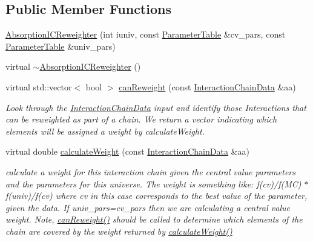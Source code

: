 \subsection*{Public Member Functions}
\begin{DoxyCompactItemize}
\item 
\hyperlink{class_neutrino_flux_reweight_1_1_absorption_i_c_reweighter_a16ce26791334162b0a512667f93044fc}{Absorption\-I\-C\-Reweighter} (int iuniv, const \hyperlink{class_neutrino_flux_reweight_1_1_parameter_table}{Parameter\-Table} \&cv\-\_\-pars, const \hyperlink{class_neutrino_flux_reweight_1_1_parameter_table}{Parameter\-Table} \&univ\-\_\-pars)
\item 
virtual \hyperlink{class_neutrino_flux_reweight_1_1_absorption_i_c_reweighter_a2851345b01ad24a57576a7d6e1c32da0}{$\sim$\-Absorption\-I\-C\-Reweighter} ()
\item 
virtual std\-::vector$<$ bool $>$ \hyperlink{class_neutrino_flux_reweight_1_1_absorption_i_c_reweighter_adb94609e23ec8ee9123abf30d52fae40}{can\-Reweight} (const \hyperlink{class_neutrino_flux_reweight_1_1_interaction_chain_data}{Interaction\-Chain\-Data} \&aa)
\begin{DoxyCompactList}\small\item\em Look through the \hyperlink{class_neutrino_flux_reweight_1_1_interaction_chain_data}{Interaction\-Chain\-Data} input and identify those Interactions that can be reweighted as part of a chain. We return a vector indicating which elements will be assigned a weight by calculate\-Weight. \end{DoxyCompactList}\item 
virtual double \hyperlink{class_neutrino_flux_reweight_1_1_absorption_i_c_reweighter_a07104ede5adc45dfeda61fc90004bec3}{calculate\-Weight} (const \hyperlink{class_neutrino_flux_reweight_1_1_interaction_chain_data}{Interaction\-Chain\-Data} \&aa)
\begin{DoxyCompactList}\small\item\em calculate a weight for this interaction chain given the central value parameters and the parameters for this universe. The weight is something like\-: f(cv)/f(M\-C) $\ast$ f(univ)/f(cv) where cv in this case corresponds to the best value of the parameter, given the data. If univ\-\_\-pars=cv\-\_\-pars then we are calculating a central value weight. Note, \hyperlink{class_neutrino_flux_reweight_1_1_absorption_i_c_reweighter_adb94609e23ec8ee9123abf30d52fae40}{can\-Reweight()} should be called to determine which elements of the chain are covered by the weight returned by \hyperlink{class_neutrino_flux_reweight_1_1_absorption_i_c_reweighter_a07104ede5adc45dfeda61fc90004bec3}{calculate\-Weight()} \end{DoxyCompactList}\end{DoxyCompactItemize}
